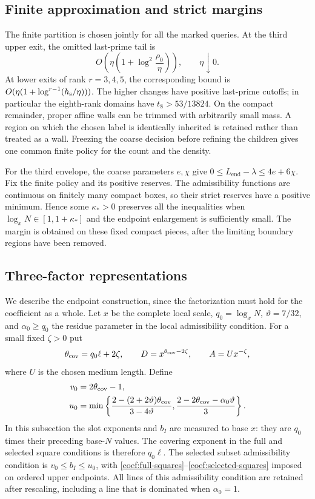 \subsection{Finite approximation and strict margins}

The finite partition is chosen jointly for all the marked queries.
At the third upper exit, the omitted last-prime tail is
\[
 O\!\left(\eta\left(1+\log^2\frac{\rho_0}{\eta}\right)\right),
 \qquad\eta\downarrow0.
\]
At lower exits of rank $r=3,4,5$, the corresponding bound is
$O(\eta(1+\log^{r-1}({h_{\rm s}}/\eta)))$.  The higher changes have positive
last-prime cutoffs; in particular the eighth-rank domains have
$t_8>53/13824$.  On the compact remainder, proper affine walls can be
trimmed with arbitrarily small mass.  A region on which the chosen
label is identically inherited is retained rather than treated as a
wall.  Freezing the coarse decision before refining the children gives
one common finite policy for the count and the density.

For the third envelope, the coarse parameters $e,\chi$ give
$0\le L_{\mathrm{end}}-\lambda\le4e+6\chi$.
Fix the finite policy and its positive reserves. The admissibility
functions are continuous on finitely many compact boxes, so their
strict reserves have a positive minimum. Hence some $\kappa_*>0$
preserves all the inequalities when
$\log_xN\in[1,1+\kappa_*]$ and the endpoint enlargement is
sufficiently small. The margin is obtained on these fixed compact
pieces, after the limiting boundary regions have been removed.

\subsection{Three-factor representations}

We describe the endpoint construction, since the factorization must hold
for the coefficient as a whole.  Let $x$ be the complete local scale,
$q_0=\log_x N$, $\vartheta=7/32$, and $\alpha_0\ge q_0$ the residue
parameter in the local admissibility condition.  For a small fixed $\zeta>0$ put
\[
 \theta_{\rm cov}=q_0\ell+2\zeta,\qquad D=x^{\theta_{\rm cov}-2\zeta},
 \qquad A=Ux^{-\zeta},
\]
where $U$ is the chosen medium length.  Define
\begin{align*}
 v_0&=2\theta_{\rm cov}-1,\\
 u_0&=\min\left\{
 \frac{2-(2+2\vartheta)\theta_{\rm cov}}{3-4\vartheta},
 \frac{2-2\theta_{\rm cov}-\alpha_0\vartheta}{3}\right\}.
\end{align*}
In this subsection the slot exponents and $b_I$ are measured to base
$x$: they are $q_0$ times their preceding base-$N$ values.  The covering
exponent in the full and selected square conditions is therefore
$q_0\ell$.
The selected subset admissibility condition is $v_0\le b_I\le u_0$,
with \eqref{coef:full-squares}--\eqref{coef:selected-squares} imposed
on ordered upper endpoints.  All lines of this admissibility condition are retained
after rescaling, including a line that is dominated when $\alpha_0=1$.


